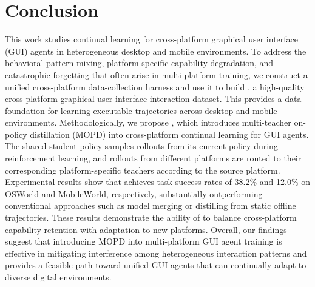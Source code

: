 \section{Conclusion}
\label{sec:conclusion}

This work studies continual learning for cross-platform graphical user interface (GUI) agents in heterogeneous desktop and mobile environments. To address the behavioral pattern mixing, platform-specific capability degradation, and catastrophic forgetting that often arise in multi-platform training, we construct a unified cross-platform data-collection harness and use it to build \BENCH, a high-quality cross-platform graphical user interface interaction dataset. This provides a data foundation for learning executable trajectories across desktop and mobile environments.
Methodologically, we propose \METHODNAME, which introduces multi-teacher on-policy distillation (MOPD) into cross-platform continual learning for GUI agents. The shared student policy samples rollouts from its current policy during reinforcement learning, and rollouts from different platforms are routed to their corresponding platform-specific teachers according to the source platform.
Experimental results show that \METHODNAME achieves task success rates of 38.2\% and 12.0\% on OSWorld and MobileWorld, respectively, substantially outperforming conventional approaches such as model merging or distilling from static offline trajectories. These results demonstrate the ability of \METHODNAME to balance cross-platform capability retention with adaptation to new platforms. Overall, our findings suggest that introducing MOPD into multi-platform GUI agent training is effective in mitigating interference among heterogeneous interaction patterns and provides a feasible path toward unified GUI agents that can continually adapt to diverse digital environments.



